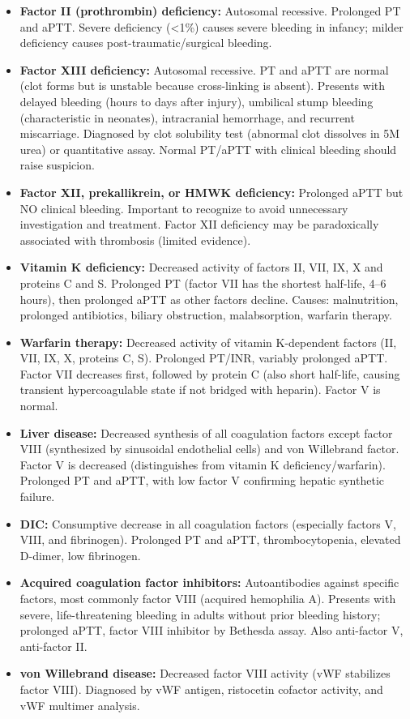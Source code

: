 \begin{itemize}
  \item \textbf{Factor II (prothrombin) deficiency:} Autosomal recessive. Prolonged PT and aPTT. Severe deficiency (<1\%) causes severe bleeding in infancy; milder deficiency causes post-traumatic/surgical bleeding.
  \item \textbf{Factor XIII deficiency:} Autosomal recessive. PT and aPTT are normal (clot forms but is unstable because cross-linking is absent). Presents with delayed bleeding (hours to days after injury), umbilical stump bleeding (characteristic in neonates), intracranial hemorrhage, and recurrent miscarriage. Diagnosed by clot solubility test (abnormal clot dissolves in 5M urea) or quantitative assay. Normal PT/aPTT with clinical bleeding should raise suspicion.
  \item \textbf{Factor XII, prekallikrein, or HMWK deficiency:} Prolonged aPTT but NO clinical bleeding. Important to recognize to avoid unnecessary investigation and treatment. Factor XII deficiency may be paradoxically associated with thrombosis (limited evidence).
  \item \textbf{Vitamin K deficiency:} Decreased activity of factors II, VII, IX, X and proteins C and S. Prolonged PT (factor VII has the shortest half-life, 4--6 hours), then prolonged aPTT as other factors decline. Causes: malnutrition, prolonged antibiotics, biliary obstruction, malabsorption, warfarin therapy.
  \item \textbf{Warfarin therapy:} Decreased activity of vitamin K-dependent factors (II, VII, IX, X, proteins C, S). Prolonged PT/INR, variably prolonged aPTT. Factor VII decreases first, followed by protein C (also short half-life, causing transient hypercoagulable state if not bridged with heparin). Factor V is normal.
  \item \textbf{Liver disease:} Decreased synthesis of all coagulation factors except factor VIII (synthesized by sinusoidal endothelial cells) and von Willebrand factor. Factor V is decreased (distinguishes from vitamin K deficiency/warfarin). Prolonged PT and aPTT, with low factor V confirming hepatic synthetic failure.
  \item \textbf{DIC:} Consumptive decrease in all coagulation factors (especially factors V, VIII, and fibrinogen). Prolonged PT and aPTT, thrombocytopenia, elevated D-dimer, low fibrinogen.
  \item \textbf{Acquired coagulation factor inhibitors:} Autoantibodies against specific factors, most commonly factor VIII (acquired hemophilia A). Presents with severe, life-threatening bleeding in adults without prior bleeding history; prolonged aPTT, factor VIII inhibitor by Bethesda assay. Also anti-factor V, anti-factor II.
  \item \textbf{von Willebrand disease:} Decreased factor VIII activity (vWF stabilizes factor VIII). Diagnosed by vWF antigen, ristocetin cofactor activity, and vWF multimer analysis.
\end{itemize}

